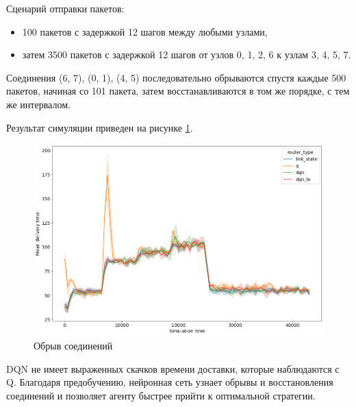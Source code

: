 \documentclass[a4paper]{article}
\begin{document}
Сценарий отправки пакетов:

\begin{itemize}
    \item 100 пакетов с задержкой 12 шагов между любыми узлами,

    \item затем 3500 пакетов с задержкой 12 шагов от узлов 0, 1, 2, 6 к узлам 3, 4,
        5, 7.
\end{itemize}

Соединения (6, 7), (0, 1), (4, 5) последовательно обрываются спустя каждые 500
пакетов, начиная со 101 пакета, затем восстанавливаются в том же порядке, с тем
же интервалом.

Результат симуляции приведен на рисунке \ref{fig:link}.

\begin{figure}[H]
    \centering
    \includegraphics[width=\textwidth]{figs/link-break}
    \caption{Обрыв соединений}\label{fig:link}
\end{figure}

DQN не имеет выраженных скачков времени доставки, которые наблюдаются с Q.
Благодаря предобучению, нейронная сеть узнает обрывы и восстановления
соединений и позволяет агенту быстрее прийти к оптимальной стратегии.
\end{document}
